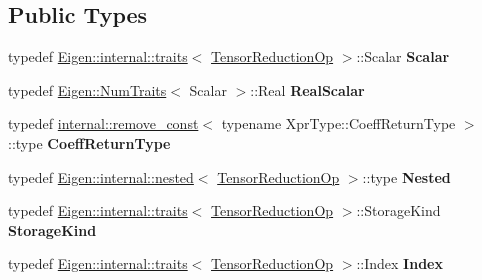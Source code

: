 \subsection*{Public Types}
\begin{DoxyCompactItemize}
\item 
\mbox{\label{class_eigen_1_1_tensor_reduction_op_a270a050b616d21c50f3e3579c80f29c6}} 
typedef \hyperlink{struct_eigen_1_1internal_1_1traits}{Eigen\+::internal\+::traits}$<$ \hyperlink{class_eigen_1_1_tensor_reduction_op}{Tensor\+Reduction\+Op} $>$\+::Scalar {\bfseries Scalar}
\item 
\mbox{\label{class_eigen_1_1_tensor_reduction_op_ab8c0e1c64b0c349b5df071d3efc2e801}} 
typedef \hyperlink{group___core___module_struct_eigen_1_1_num_traits}{Eigen\+::\+Num\+Traits}$<$ Scalar $>$\+::Real {\bfseries Real\+Scalar}
\item 
\mbox{\label{class_eigen_1_1_tensor_reduction_op_a3c887ebb74b9232e849c3d49d994dcf3}} 
typedef \hyperlink{struct_eigen_1_1internal_1_1remove__const}{internal\+::remove\+\_\+const}$<$ typename Xpr\+Type\+::\+Coeff\+Return\+Type $>$\+::type {\bfseries Coeff\+Return\+Type}
\item 
\mbox{\label{class_eigen_1_1_tensor_reduction_op_a3a1c56fb5f45577d7ad7820553db1054}} 
typedef \hyperlink{struct_eigen_1_1internal_1_1nested}{Eigen\+::internal\+::nested}$<$ \hyperlink{class_eigen_1_1_tensor_reduction_op}{Tensor\+Reduction\+Op} $>$\+::type {\bfseries Nested}
\item 
\mbox{\label{class_eigen_1_1_tensor_reduction_op_a3a5b36e80467952c79c19e1979ed0952}} 
typedef \hyperlink{struct_eigen_1_1internal_1_1traits}{Eigen\+::internal\+::traits}$<$ \hyperlink{class_eigen_1_1_tensor_reduction_op}{Tensor\+Reduction\+Op} $>$\+::Storage\+Kind {\bfseries Storage\+Kind}
\item 
\mbox{\label{class_eigen_1_1_tensor_reduction_op_a6a5cf586d26b3a89a4d660ab51fb61a9}} 
typedef \hyperlink{struct_eigen_1_1internal_1_1traits}{Eigen\+::internal\+::traits}$<$ \hyperlink{class_eigen_1_1_tensor_reduction_op}{Tensor\+Reduction\+Op} $>$\+::Index {\bfseries Index}

\end{DoxyCompactItemize}
